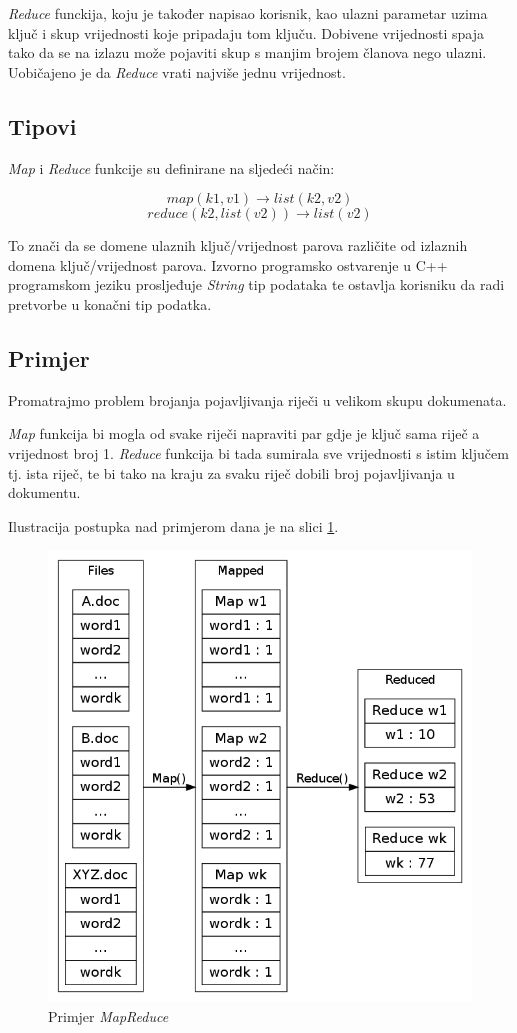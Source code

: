 \documentclass[11pt]{article}
\begin{document}
\emph{Reduce} funckija, koju je također napisao korisnik, kao ulazni parametar uzima ključ i skup vrijednosti koje pripadaju tom ključu. Dobivene vrijednosti spaja tako da se na izlazu može pojaviti skup s manjim brojem članova nego ulazni. Uobičajeno je da \emph{Reduce} vrati najviše jednu vrijednost. 

\subsection{Tipovi}
\emph{Map} i \emph{Reduce} funkcije su definirane na sljedeći način:

$$map(k1,v1) \rightarrow  list(k2,v2)$$
$$reduce(k2,list(v2)) \rightarrow  list(v2)$$

To znači da se domene ulaznih ključ/vrijednost parova različite od izlaznih domena ključ/vrijednost parova. Izvorno programsko ostvarenje u C++ programskom jeziku prosljeđuje \emph{String} tip podataka te ostavlja korisniku da radi pretvorbe u konačni tip podatka.

\subsection{Primjer}
Promatrajmo problem brojanja pojavljivanja riječi u velikom skupu dokumenata.

\emph{Map} funkcija bi mogla od svake riječi napraviti par gdje je ključ sama riječ a vrijednost broj 1. \emph{Reduce} funkcija bi tada sumirala sve vrijednosti s istim ključem tj. ista riječ, te bi tako na kraju za svaku riječ dobili broj pojavljivanja u dokumentu. 

Ilustracija postupka nad primjerom dana je na slici \ref{primjer}.
\begin{figure}[H]
\centering
\includegraphics[scale=0.3]{ilustracija.png}
\caption{Primjer \emph{MapReduce}}
\label{primjer}
\end{figure}
\end{document}
